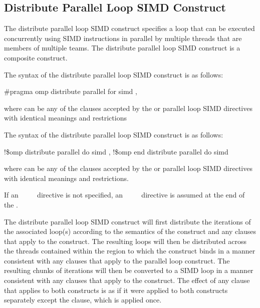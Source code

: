 \subsection{Distribute Parallel Loop SIMD Construct}
\label{subsec:Distribute Parallel Loop SIMD Construct}
\summary
The distribute parallel loop SIMD construct specifies a loop that can be executed 
concurrently using SIMD instructions in parallel by multiple threads that are members 
of multiple teams. The distribute parallel loop SIMD construct is a composite construct.

\syntax
\ccppspecificstart
The syntax of the distribute parallel loop SIMD construct is as follows:

\begin{boxedcode}
\#pragma omp distribute parallel for simd \plc{[clause[ [},\plc{] clause] ... ]}
\end{boxedcode}

where  can be any of the clauses accepted by the  or parallel loop 
SIMD directives with identical meanings and restrictions
\ccppspecificend

\fortranspecificstart
The syntax of the distribute parallel loop SIMD construct is as follows:

\begin{boxedcode}
!\$omp distribute parallel do simd \plc{[clause[ [},\plc{] clause] ... ]}
\plc{[}!\$omp end distribute parallel do simd\plc{]}
\end{boxedcode}

where  can be any of the clauses accepted by the  or parallel loop 
SIMD directives with identical meanings and restrictions.

If an ~~~~ directive is not specified, an 
~~~~ directive is assumed at the end of the .
\fortranspecificend

\descr
The distribute parallel loop SIMD construct will first distribute the iterations of the 
associated loop(s) according to the semantics of the  construct and any 
clauses that apply to the  construct. The resulting loops will then be 
distributed across the threads contained within the  region to which the
 construct binds in a manner consistent with any clauses that apply to the 
parallel loop construct. The resulting chunks of iterations will then be converted to a 
SIMD loop in a manner consistent with any clauses that apply to the  construct. 
The effect of any clause that applies to both constructs is as if it were applied to both constructs separately except the  clause, which is applied once.


